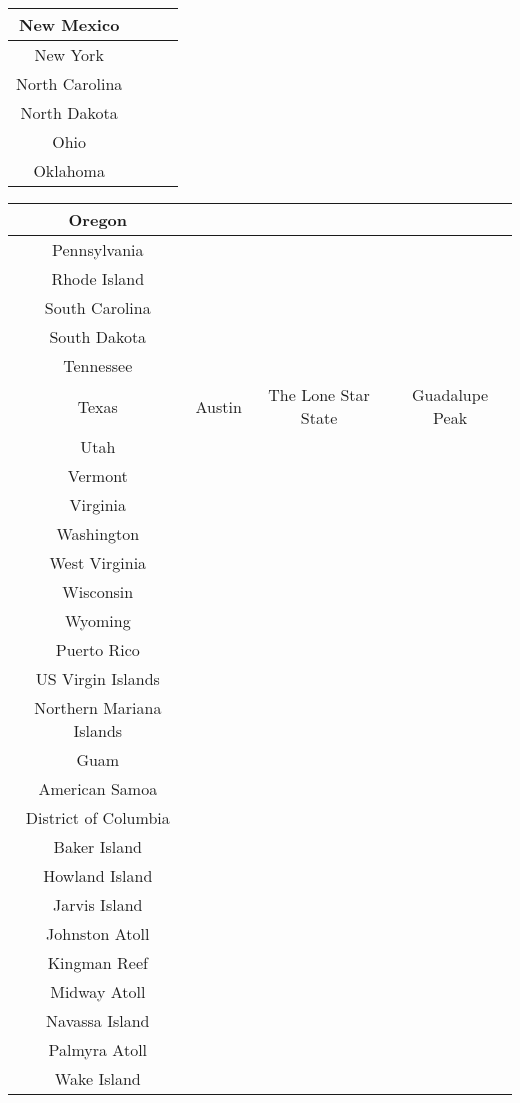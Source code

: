 \begin{tabular}{|c|c|c|c|}
				 New Mexico 	& & &  \\
				 \hline
				 New York 	& & &  \\
				 \hline
				 North Carolina 	& & &  \\
				 \hline
				 North Dakota 	& & &  \\
				 \hline
				 Ohio 	& & &  \\
				 \hline
				 Oklahoma 	& & &  \\
				 \hline
				 	\end{tabular}
			 
		 \begin{tabular}{|c|c|c|c|}
				 \hline
				 Oregon 	& & &  \\
				 \hline
				 Pennsylvania 	& & &  \\
				 \hline
				 Rhode Island 	& & &  \\
				 \hline
				 South Carolina 	& & &  \\
				 \hline
				 South Dakota 	& & &  \\
				 \hline
				 Tennessee 	& & &  \\
				 \hline
				 Texas 	& Austin & The Lone Star State & Guadalupe Peak \\
				 \hline
				 Utah 	& & &  \\
				 \hline
				 Vermont 	& & &  \\
				 \hline
				 Virginia 	& & &  \\
				 \hline
				 Washington 	& & &  \\
				 \hline
				 West Virginia 	& & &  \\
				 \hline
				 Wisconsin 	& & &  \\
				 \hline
				 Wyoming 	& & &  \\
				 \hline
				 Puerto Rico	& & &  \\
				 \hline
				 US Virgin Islands	& & &  \\
				 \hline
				 Northern Mariana Islands	& & &  \\
				 \hline
				 Guam	& & &  \\
				 \hline
				 American Samoa	& & &  \\
				 \hline
				 District of Columbia	& & &  \\
				 \hline
				 Baker Island 	& & &  \\
				 \hline
				 Howland Island 	& & &  \\
				 \hline
				 Jarvis Island 	& & &  \\
				 \hline
				 Johnston Atoll 	& & &  \\
				 \hline
				 Kingman Reef 	& & &  \\
				 \hline
				 Midway Atoll 	& & &  \\
				 \hline
				 Navassa Island 	& & &  \\
				 \hline
				 Palmyra Atoll 	& & &  \\
				 \hline
				 Wake Island	& & &  \\
				 \hline
				 
				 
			\end{tabular}
			
